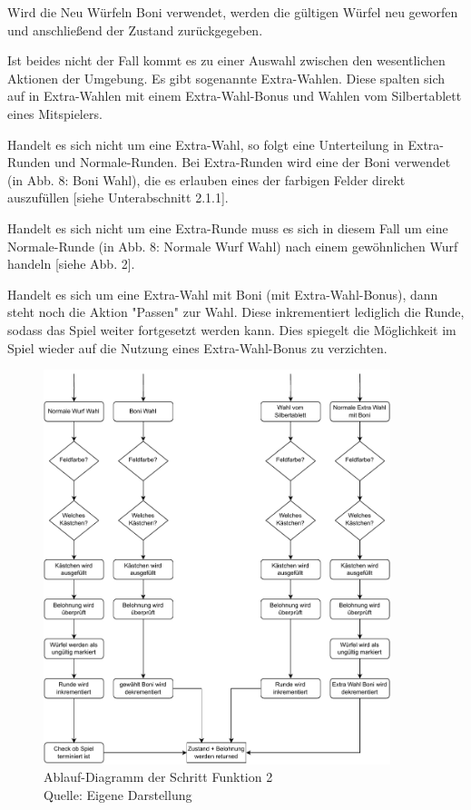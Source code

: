 Wird die Neu Würfeln Boni verwendet, werden die gültigen Würfel neu geworfen und anschließend der Zustand zurückgegeben.

Ist beides nicht der Fall kommt es zu einer Auswahl zwischen den wesentlichen Aktionen der Umgebung. Es gibt sogenannte Extra-Wahlen. Diese spalten sich auf in Extra-Wahlen mit einem Extra-Wahl-Bonus und Wahlen vom Silbertablett eines Mitspielers.

Handelt es sich nicht um eine Extra-Wahl, so folgt eine Unterteilung in Extra-Runden und Normale-Runden. Bei Extra-Runden wird eine der Boni verwendet (in Abb. 8: Boni Wahl), die es erlauben eines der farbigen Felder direkt auszufüllen [siehe Unterabschnitt 2.1.1].

Handelt es sich nicht um eine Extra-Runde muss es sich in diesem Fall um eine Normale-Runde (in Abb. 8: Normale Wurf Wahl) nach einem gewöhnlichen Wurf handeln [siehe Abb. 2].

Handelt es sich um eine Extra-Wahl mit Boni (mit Extra-Wahl-Bonus), dann steht noch die Aktion "Passen" zur Wahl. Diese inkrementiert lediglich die Runde, sodass das Spiel weiter fortgesetzt werden kann. Dies spiegelt die Möglichkeit im Spiel wieder auf die Nutzung eines Extra-Wahl-Bonus zu verzichten.\\

\begin{figure}[H]
	\centering
	\includegraphics[width=0.9\textwidth]{Bilder/step2.drawio} 
	\caption[Ablauf-Diagramm der Schritt-Funktion 2]{Ablauf-Diagramm der Schritt Funktion 2\\ Quelle: Eigene Darstellung}
\end{figure}

